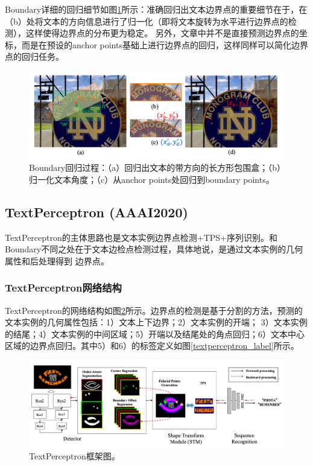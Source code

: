 Boundary详细的回归细节如图\ref{boundary_regress}所示：准确回归出文本边界点的重要细节在于，在（b）处将文本的方向信息进行了归一化（即将文本旋转为水平进行边界点的检测），这样使得边界点的分布更为稳定。
另外，文章中并不是直接预测边界点的坐标，而是在预设的anchor points基础上进行边界点的回归，这样同样可以简化边界点的回归任务。
\begin{figure}[H]
    \centering
    \includegraphics[width=.98\textwidth]{figure/spotting/boundary_regress.png} 
    \caption{Boundary回归过程：（a）回归出文本的带方向的长方形包围盒；（b）归一化文本角度；（c）从anchor points处回归到boundary points。} 
    \label{boundary_regress} 
\end{figure}

\subsection{TextPerceptron (AAAI2020)}
TextPerceptron的主体思路也是文本实例边界点检测+TPS+序列识别。和Boundary不同之处在于文本边检点检测过程，具体地说，是通过文本实例的几何属性和后处理得到
边界点。
\subsubsection{TextPerceptron网络结构}
TextPerceptron的网络结构如图\ref{textperceptron_framework}所示。边界点的检测是基于分割的方法，预测的文本实例的几何属性包括：1）文本上下边界；2）文本实例的开端；
3）文本实例的结尾；4）文本实例的中间区域；5）开端以及结尾处的角点回归；6）文本中心区域的边界点回归。其中5）和6）的标签定义如图\ref{textperceptron_label}所示。
\begin{figure}[htb]
    \centering
    \includegraphics[width=.98\textwidth]{figure/spotting/textperceptron_framework.png} 
    \caption{TextPerceptron框架图。} 
    \label{textperceptron_framework} 
\end{figure}

